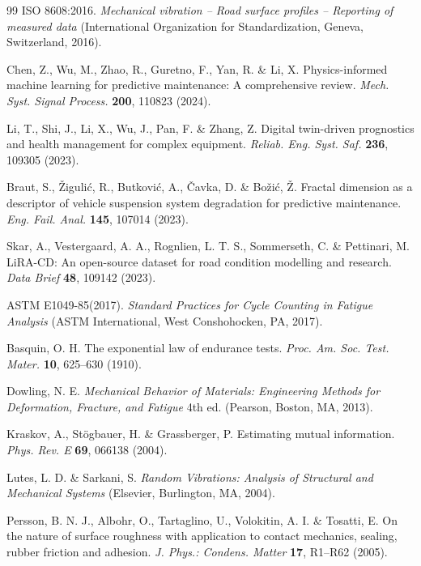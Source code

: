 \documentclass[11pt,letterpaper]{article}
\begin{document}
\begin{thebibliography}{99}
ISO 8608:2016. \textit{Mechanical vibration -- Road surface profiles -- Reporting of measured data} (International Organization for Standardization, Geneva, Switzerland, 2016).

Chen, Z., Wu, M., Zhao, R., Guretno, F., Yan, R. \& Li, X. Physics-informed machine learning for predictive maintenance: A comprehensive review. \textit{Mech. Syst. Signal Process.} \textbf{200}, 110823 (2024).

Li, T., Shi, J., Li, X., Wu, J., Pan, F. \& Zhang, Z. Digital twin-driven prognostics and health management for complex equipment. \textit{Reliab. Eng. Syst. Saf.} \textbf{236}, 109305 (2023).

Braut, S., Žigulić, R., Butković, A., Čavka, D. \& Božić, Ž. Fractal dimension as a descriptor of vehicle suspension system degradation for predictive maintenance. \textit{Eng. Fail. Anal.} \textbf{145}, 107014 (2023).

Skar, A., Vestergaard, A. A., Rognlien, L. T. S., Sommerseth, C. \& Pettinari, M. LiRA-CD: An open-source dataset for road condition modelling and research. \textit{Data Brief} \textbf{48}, 109142 (2023).

ASTM E1049-85(2017). \textit{Standard Practices for Cycle Counting in Fatigue Analysis} (ASTM International, West Conshohocken, PA, 2017).

Basquin, O. H. The exponential law of endurance tests. \textit{Proc. Am. Soc. Test. Mater.} \textbf{10}, 625--630 (1910).

Dowling, N. E. \textit{Mechanical Behavior of Materials: Engineering Methods for Deformation, Fracture, and Fatigue} 4th ed. (Pearson, Boston, MA, 2013).

Kraskov, A., Stögbauer, H. \& Grassberger, P. Estimating mutual information. \textit{Phys. Rev. E} \textbf{69}, 066138 (2004).

Lutes, L. D. \& Sarkani, S. \textit{Random Vibrations: Analysis of Structural and Mechanical Systems} (Elsevier, Burlington, MA, 2004).

Persson, B. N. J., Albohr, O., Tartaglino, U., Volokitin, A. I. \& Tosatti, E. On the nature of surface roughness with application to contact mechanics, sealing, rubber friction and adhesion. \textit{J. Phys.: Condens. Matter} \textbf{17}, R1--R62 (2005).


\end{thebibliography}
\end{document}
